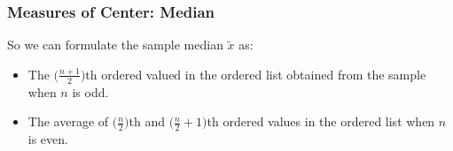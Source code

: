 \documentclass{beamer}\usepackage[]{graphicx}\usepackage[]{color}
\begin{document}
\begin{frame}
\frametitle{Measures of Center: Median}
So we can formulate the sample median $\tilde{x}$ as: 
\begin{itemize}
\item The $\big(\tfrac{n+1}{2}\big)$th ordered valued in the ordered list obtained from the sample when $n$ is odd.

\item The average of $\big(\tfrac{n}{2}\big)$th and $\big(\tfrac{n}{2} + 1\big)$th ordered values in the ordered list when $n$ is even.
\end{itemize}

\end{frame}
\end{document}
